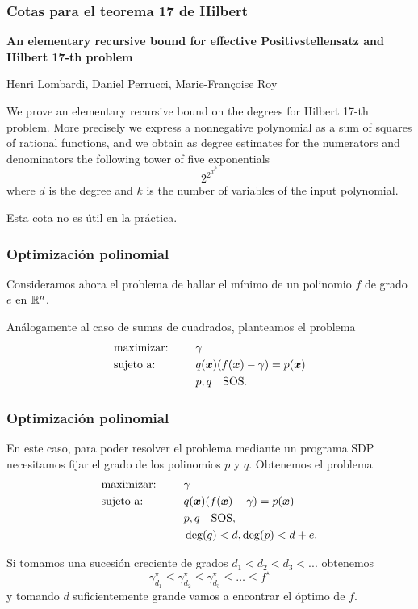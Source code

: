 \documentclass[aspectratio=169,12pt,spanish]{beamer}
\begin{document}
\begin{frame}

\frametitle{Cotas para el teorema 17 de Hilbert}

{\footnotesize
\textbf{An elementary recursive bound for effective Positivstellensatz and Hilbert 17-th problem}

Henri Lombardi, Daniel Perrucci, Marie-Françoise Roy

We prove an elementary recursive bound on the degrees for Hilbert 17-th problem. More
precisely we express a nonnegative polynomial as a sum of squares of rational functions, and
we obtain as degree estimates for the numerators and denominators the following tower of
five exponentials
$$2^{2^{d^{4^k}}}$$
where $d$ is the degree and $k$ is the number of variables of the input polynomial.
}

\vspace{0.5cm}

Esta cota no es útil en la práctica.

\end{frame}



\begin{frame}

\frametitle{Optimización polinomial}

Consideramos ahora el problema de hallar el mínimo de un polinomio $f$ de grado $e$ en $\mathbb{R}^n$.

Análogamente al caso de sumas de cuadrados, planteamos el problema
\begin{alignat*}{2}
  & \text{maximizar: } & & \gamma  \\
  & \text{sujeto a: } & \quad & q(\bm{x}) (f(\bm{x}) - \gamma) =  p(\bm{x}) \\
  &&& p, q \quad \text{SOS}.
\end{alignat*}

\end{frame}



\begin{frame}

\frametitle{Optimización polinomial}

En este caso, para poder resolver el problema mediante un programa SDP necesitamos fijar el grado de los polinomios $p$ y $q$. Obtenemos el problema
\begin{alignat*}{2}
  & \text{maximizar: } & & \gamma  \\
  & \text{sujeto a: } & \quad & q(\bm{x}) (f(\bm{x}) - \gamma) =  p(\bm{x}) \\
  &&& p, q \quad \text{SOS}, \\
  &&& \deg(q) < d, \deg(p) < d + e.
\end{alignat*}

Si tomamos una sucesión creciente de grados $d_1 < d_2 < d_3 < ...$ obtenemos
$$
\gamma^{\star}_{d_1} \le \gamma^{\star}_{d_2} \le \gamma^{\star}_{d_3} \le \dots \le f^{\star}
$$
y tomando $d$ suficientemente grande vamos a encontrar el óptimo de $f$.


\end{frame}
\end{document}
